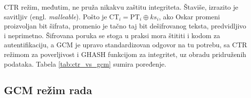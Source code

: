 CTR režim, međutim, ne pruža nikakvu zaštitu integriteta. Štaviše, izrazito je savitljiv (engl. \textit{malleable}). Pošto je $\mathrm{CT}_i = \mathrm{PT}_i \oplus ks_i$, ako Oskar promeni proizvoljan bit šifrata, promenio je tačno taj bit dešifrovanog teksta, predvidljivo i neprimetno. Šifrovana poruka se stoga u praksi mora štititi i kodom za autentifikaciju, a GCM je upravo standardizovan odgovor na tu potrebu, sa CTR režimom za poverljivost i GHASH funkcijom za integritet, uz obradu pridruženih podataka. Tabela \ref{tab:ctr_vs_gcm} sumira poređenje.

\begin{table}[H]
\caption{Poređenje CTR i GCM režima rada}
\centering
{}
\label{tab:ctr_vs_gcm}
\end{table}

\subsection{GCM režim rada}
\label{subsec:gcm_rezim}

